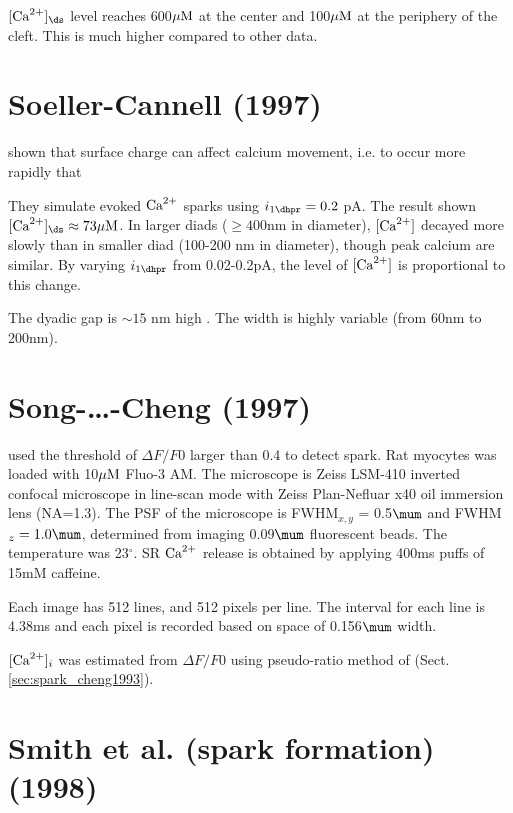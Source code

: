 $[\Ca]_\ds$ level reaches 600${\mu\text{M}}$ at the center and 100${\mu\text{M}}$ at the periphery
of the cleft. This is much higher compared to other data. 


\section{Soeller-Cannell (1997)}
\label{sec:soeller-cannell_97}

\citep{soeller1997} \cite{cannell1997} shown that surface charge can affect
calcium movement, i.e. to occur more rapidly that 

They simulate evoked ${\text{Ca}^{2+}}$ sparks using
$i_{1\dhpr}=0.2$ pA. The result shown $[\Ca]_\ds \approx 73\muM$. In larger
diads ($\ge 400$nm in diameter), $[{\text{Ca}^{2+}}]$ decayed more slowly than in smaller
diad (100-200 nm in diameter), though peak calcium are similar. By varying
$i_{1\dhpr}$ from 0.02-0.2pA, the level of $[{\text{Ca}^{2+}}]$ is proportional to this
change. 

The dyadic gap is $\sim 15$ nm high \citep{Radermacher1994}. The width is highly
variable (from 60nm to 200nm).

\section{Song-\ldots-Cheng (1997)}

\citep{song1997} used the threshold of $\Delta F/F0$ larger than 0.4 to detect
spark. Rat myocytes was loaded with 10${\mu\text{M}}$ Fluo-3 AM. The microscope is Zeiss
LSM-410 inverted confocal microscope in line-scan mode with Zeiss Plan-Nefluar
x40 oil immersion lens (NA=1.3). The PSF of the microscope is
FWHM$_{x,y}$ = 0.5$\mum$ and FWHM$_{z}=1.0\mum$, determined from imaging
0.09$\mum$ fluorescent beads. The temperature was 23$^\circ$. SR ${\text{Ca}^{2+}}$ release
is obtained by applying 400ms puffs of 15mM caffeine. 

Each image has 512 lines, and 512 pixels per line. The interval for each line is
4.38ms and each pixel is recorded based on space of 0.156$\mum$ width.

$[{\text{Ca}^{2+}}]_i$ was estimated from $\Delta F/F0$ using pseudo-ratio method of
\citep{cheng1993cse} (Sect.\ref{sec:spark_cheng1993}).



\section{Smith et al. (spark formation) (1998) }
\label{sec:smith-et-al}

